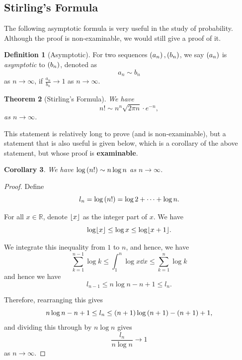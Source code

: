 \documentclass{article}
\newtheorem{theorem}{Theorem}[section]
\newtheorem{corollary}[theorem]{Corollary}
\theoremstyle{definition}
\newtheorem{definition}[theorem]{Definition}
\theoremstyle{remark}
\newcommand{\RR}{\mathbb{R}}
\DeclarePairedDelimiter{\floor}{\lfloor}{\rfloor}
\begin{document}
\subsection{Stirling's Formula}

The following asymptotic formula is very useful in the study of probability. Although the proof is non-examinable, we would still give a proof of it.

\begin{definition}[Asymptotic]
    \label{def:asymptotic}%
    For two sequences \(\left(a_n\right), \left(b_n\right)\), we say \(\left(a_n\right)\) is \emph{asymptotic} to \(\left(b_n\right)\), denoted as
    \[
        a_n \sim b_n
    \]
    as \(n \to \infty\), if \(\frac{a_n}{b_n} \to 1\) as \(n \to \infty\).
\end{definition}

\begin{theorem}[Stirling's Formula]
    \label{thm:stirling-formula}%
    We have
    \[
        n! \sim n^n \sqrt{2 \pi n} \cdot e^{-n},
    \]
    as \(n \to \infty\).
\end{theorem}

This statement is relatively long to prove (and is non-examinable), but a statement that is also useful is given below, which is a corollary of the above statement, but whose proof is \textbf{examinable}.

\begin{corollary}
    \label{cor:weaker-statement-of-stirling}%
    We have \(\log \left(n!\right) \sim n \log n\) as \(n \to \infty\).
\end{corollary}

\begin{proof}
    Define
    \[
        l_n = \log\left(n!\right) = \log 2 + \cdots + \log n.
    \]

    For all \(x \in \RR\), denote \(\floor{x}\) as the integer part of \(x\). We have
    \[
        \log \floor{x} \leq \log x \leq \log \floor{x + 1}.
    \]

    We integrate this inequality from \(1\) to \(n\), and hence, we have
    \[
        \sum_{k = 1}^{n - 1} \log k \leq \int_{1}^{n} \log x \dd{x} \leq \sum_{k = 1}^{n} \log k
    \]
    and hence we have
    \[
        l_{n - 1} \leq n \log n - n + 1 \leq l_n.
    \]

    Therefore, rearranging this gives
    \[
        n \log n - n + 1 \leq l_n \leq \left(n + 1\right) \log \left(n + 1\right) - \left(n + 1\right) + 1,
    \]
    and dividing this through by \(n \log n\) gives
    \[
        \frac{l_n}{n \log n} \to 1
    \]
    as \(n \to \infty\).
\end{proof}
\end{document}
